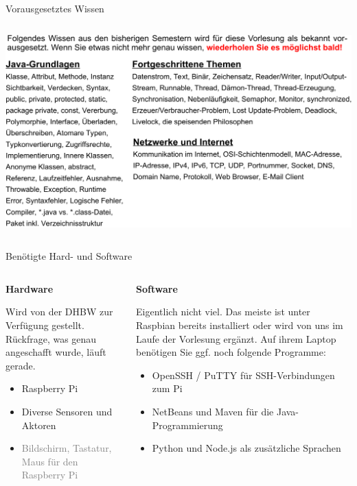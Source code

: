 \begin{frame}{Vorausgesetztes Wissen}
    \begin{columns}
        \column{\dimexpr\paperwidth-10pt}
        \includegraphics[width=\textwidth]{1-grundlagen/img/vorausgesetztes_wissen}
    \end{columns}
\end{frame}


\begin{frame}{Benötigte Hard- und Software}
        \begin{columns}
            \begin{column}[T]{.5\textwidth}
                \textbf{Hardware}
                \medskip

                Wird von der DHBW zur Verfügung gestellt. Rückfrage, was genau
                angeschafft wurde, läuft gerade. \smiley{}
                \medskip

                \begin{itemize}
                    \item Raspberry Pi
                    \item Diverse Sensoren und Aktoren
                    \item \textcolor{gray}{Bildschirm, Tastatur, Maus für den Raspberry Pi}
                \end{itemize}
            \end{column}
            \begin{column}[T]{.5\textwidth}
                \textbf{Software}
                \medskip

                Eigentlich nicht viel. Das meiste ist unter Raspbian bereits
                installiert oder wird von uns im Laufe der Vorlesung ergänzt.
                Auf ihrem Laptop benötigen Sie ggf. noch folgende Programme:
                \medskip

                \begin{itemize}
                    \item OpenSSH / PuTTY für SSH-Verbindungen zum Pi
                    \item NetBeans und Maven für die Java-Programmierung
                    \item Python und Node.js als zusätzliche Sprachen
                \end{itemize}
            \end{column}
        \end{columns}
\end{frame}

